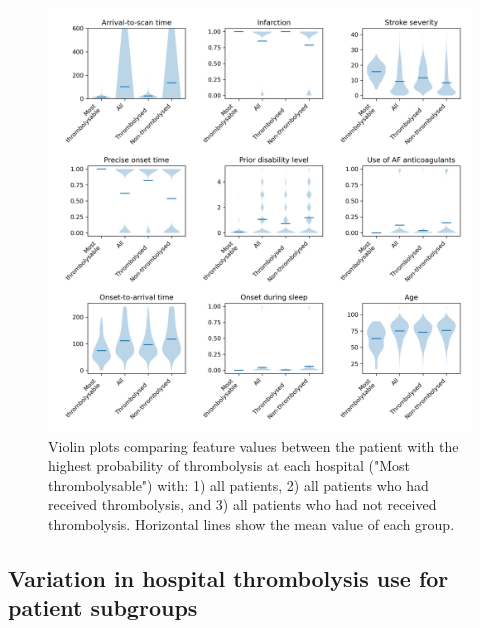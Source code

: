 \begin{figure}[!h]
\centering
\includegraphics[width=1.0\textwidth]{./images/02a_most_thrombolsyable_violin}
\caption{Violin plots comparing feature values between the patient with the highest probability of thrombolysis at each hospital ("Most thrombolysable") with: 1) all patients, 2) all patients who had received thrombolysis, and 3) all patients who had not received thrombolysis. Horizontal lines show the mean value of each group.}
\label{fig:results_most_thrombolysable}
\end{figure}



\subsection{Variation in hospital thrombolysis use for patient subgroups}

